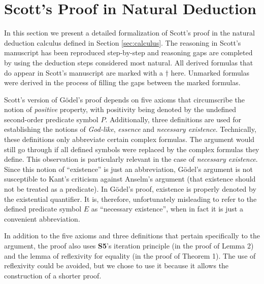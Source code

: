 \documentclass[smallextended]{svjour3}
\begin{document}
\section{Scott's Proof in Natural Deduction}\label{sec:scott}

\setcounter{axiom}{0}
\setcounter{lemma}{0}
\setcounter{theorem}{0}
\setcounter{corollary}{0}
\setcounter{definition}{0}


\newcommand{\scott}{^{\dagger}}


In this section we present a detailed formalization of Scott's proof in the natural deduction calculus defined in Section \ref{sec:calculus}. The reasoning in Scott's manuscript has been reproduced step-by-step and reasoning gaps are completed by using the deduction steps considered most natural. All derived formulas that do appear in Scott's manuscript are marked with a $\dagger$ here. Unmarked formulas were derived in the process of filling the gaps between the marked formulas. 


Scott's version of G\"odel's proof depends on five axioms that circumscribe the notion of \emph{positive} property, with positivity being denoted by the undefined second-order predicate symbol $P$. Additionally, three definitions are used for establishing the notions of \emph{God-like}, \emph{essence} and \emph{necessary existence}. Technically, these definitions only abbreviate certain complex formulas. The argument would still go through if all defined symbols were replaced by the complex formulas they define. This observation is particularly relevant in the case of \emph{necessary existence}. Since this notion of ``existence'' is just an abbreviation, G\"odel's argument is not susceptible to Kant's criticism against Anselm's argument (that existence should not be treated as a predicate). In G\"odel's proof, existence is properly denoted by the existential quantifier. It is, therefore, unfortunately misleading to refer to the defined predicate symbol $E$ as ``necessary existence'', when in fact it is just a convenient abbreviation.

In addition to the five axioms and three definitions that pertain specifically to the argument, the proof also uses {\bf S5}'s iteration principle (in the proof of Lemma 2) and the lemma of reflexivity for equality (in the proof of Theorem 1). The use of reflexivity could be avoided, but we chose to use it because it allows the construction of a shorter proof. 
\end{document}
